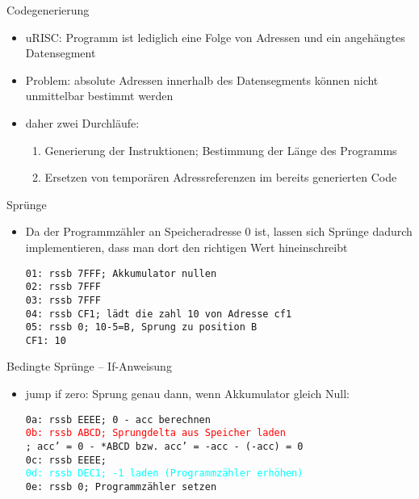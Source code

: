 \documentclass{beamer}
\begin{document}
\begin{frame}{Codegenerierung}
\begin{itemize}
	\item uRISC: Programm ist lediglich eine Folge von Adressen und ein angehängtes Datensegment
	\item Problem: absolute Adressen innerhalb des Datensegments können nicht unmittelbar bestimmt werden
	\item daher zwei Durchläufe:
	\begin{enumerate}
		\item Generierung der Instruktionen; Bestimmung der Länge des Programms
		\item Ersetzen von temporären Adressreferenzen im bereits generierten Code
	\end{enumerate}
\end{itemize}
\end{frame}

\begin{frame}{Sprünge}
\begin{itemize}
	\item Da der Programmzähler an Speicheradresse 0 ist, lassen sich Sprünge dadurch implementieren, dass man dort den richtigen Wert hineinschreibt
	
	\texttt{01: rssb 7FFF; Akkumulator nullen}\\
	\texttt{02: rssb 7FFF}\\
	\texttt{03: rssb 7FFF}\\
	\texttt{04: rssb CF1; lädt die zahl 10 von Adresse cf1} \\
	\texttt{05: rssb 0; 10-5=B, Sprung zu position B} \\
	\texttt{CF1: 10}
\end{itemize}
\end{frame}


\begin{frame}{Bedingte Sprünge -- If-Anweisung}
\begin{itemize}
	\item jump if zero: Sprung genau dann, wenn Akkumulator gleich Null:
		
	\texttt{0a: rssb EEEE; 0 - acc berechnen }\\
	\textcolor{red}{\texttt{0b: rssb ABCD; Sprungdelta aus Speicher laden}}\\
	\texttt{; acc' = 0 - *ABCD bzw.  acc' = -acc - (-acc) = 0}\\
	\texttt{0c: rssb EEEE;}\\
	\textcolor{cyan}{\texttt{0d: rssb DEC1; -1 laden (Programmzähler erhöhen)}}\\
	\texttt{0e: rssb 0; Programmzähler setzen}
\end{itemize}
\end{frame}
\end{document}
